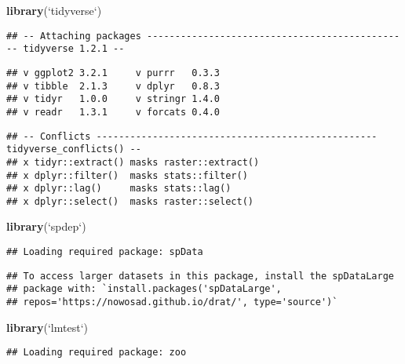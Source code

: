 \documentclass[11pt,]{article}
\newenvironment{Shaded}{\begin{snugshade}}{\end{snugshade}}
\newcommand{\KeywordTok}[1]{\textcolor[rgb]{0.13,0.29,0.53}{\textbf{#1}}}
\newcommand{\DataTypeTok}[1]{\textcolor[rgb]{0.13,0.29,0.53}{#1}}
\newcommand{\StringTok}[1]{\textcolor[rgb]{0.31,0.60,0.02}{#1}}
\newcommand{\NormalTok}[1]{#1}
\begin{document}
\begin{Shaded}
\begin{Highlighting}[]
\KeywordTok{library}\NormalTok{(}\StringTok{`}\DataTypeTok{tidyverse}\StringTok{`}\NormalTok{)}
\end{Highlighting}
\end{Shaded}

\begin{verbatim}
## -- Attaching packages ----------------------------------------------- tidyverse 1.2.1 --
\end{verbatim}

\begin{verbatim}
## v ggplot2 3.2.1     v purrr   0.3.3
## v tibble  2.1.3     v dplyr   0.8.3
## v tidyr   1.0.0     v stringr 1.4.0
## v readr   1.3.1     v forcats 0.4.0
\end{verbatim}

\begin{verbatim}
## -- Conflicts -------------------------------------------------- tidyverse_conflicts() --
## x tidyr::extract() masks raster::extract()
## x dplyr::filter()  masks stats::filter()
## x dplyr::lag()     masks stats::lag()
## x dplyr::select()  masks raster::select()
\end{verbatim}

\begin{Shaded}
\begin{Highlighting}[]
\KeywordTok{library}\NormalTok{(}\StringTok{`}\DataTypeTok{spdep}\StringTok{`}\NormalTok{)}
\end{Highlighting}
\end{Shaded}

\begin{verbatim}
## Loading required package: spData
\end{verbatim}

\begin{verbatim}
## To access larger datasets in this package, install the spDataLarge
## package with: `install.packages('spDataLarge',
## repos='https://nowosad.github.io/drat/', type='source')`
\end{verbatim}

\begin{Shaded}
\begin{Highlighting}[]
\KeywordTok{library}\NormalTok{(}\StringTok{`}\DataTypeTok{lmtest}\StringTok{`}\NormalTok{)}
\end{Highlighting}
\end{Shaded}

\begin{verbatim}
## Loading required package: zoo
\end{verbatim}
\end{document}
